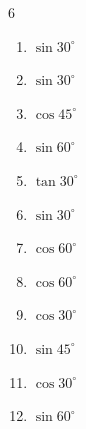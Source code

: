 \begin{multicols}{6}
\begin{enumerate}
\columnbreak %

  \item $\displaystyle \sin{30^\circ}$


  \item $\displaystyle \sin{30^\circ}$


  \item $\displaystyle \cos{45^\circ}$


  \item $\displaystyle \sin{60^\circ}$


  \item $\displaystyle \tan{30^\circ}$


  \item $\displaystyle \sin{30^\circ}$


  \item $\displaystyle \cos{60^\circ}$


  \item $\displaystyle \cos{60^\circ}$


  \item $\displaystyle \cos{30^\circ}$


  \item $\displaystyle \sin{45^\circ}$


  \item $\displaystyle \cos{30^\circ}$


  \item $\displaystyle \sin{60^\circ}$



\end{enumerate}
\end{multicols}
